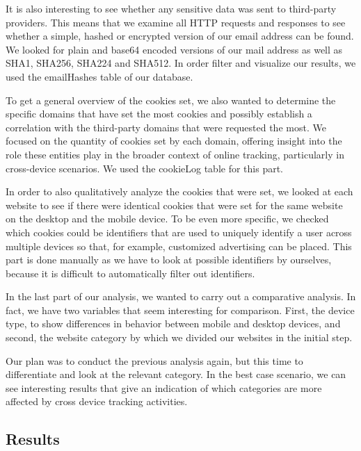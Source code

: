 It is also interesting to see whether any sensitive data was sent to third-party providers. This means that we examine all HTTP requests and responses to see whether a simple, hashed or encrypted version of our email address can be found. We looked for plain and base64 encoded versions of our mail address as well as SHA1, SHA256, SHA224 and SHA512. In order filter and visualize our results, we used the emailHashes table of our database.

To get a general overview of the cookies set, we also wanted to determine the specific domains that have set the most cookies and possibly establish a correlation with the third-party domains that were requested the most. We focused on the quantity of cookies set by each domain, offering insight into the role these entities play in the broader context of online tracking, particularly in cross-device scenarios. We used the cookieLog table for this part.

In order to also qualitatively analyze the cookies that were set, we looked at each website to see if there were identical cookies that were set for the same website on the desktop and the mobile device. To be even more specific, we checked which cookies could be identifiers that are used to uniquely identify a user across multiple devices so that, for example, customized advertising can be placed. This part is done manually as we have to look at possible identifiers by ourselves, because it is difficult to automatically filter out identifiers.

In the last part of our analysis, we wanted to carry out a comparative analysis. In fact, we have two variables that seem interesting for comparison. First, the device type, to show differences in behavior between mobile and desktop devices, and second, the website category by which we divided our websites in the initial step.

Our plan was to conduct the previous analysis again, but this time to differentiate and look at the relevant category. In the best case scenario, we can see interesting results that give an indication of which categories are more affected by cross device tracking activities.

\subsection{Results}
